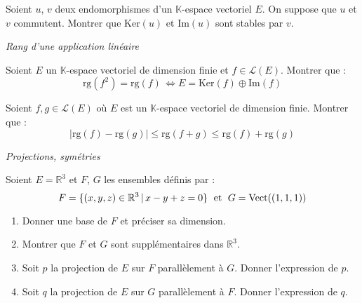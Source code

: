 \documentclass[a4paper,10pt]{report}
\begin{document}
\begin{Exercice}{} Soient $u$, $v$ deux endomorphismes d'un $\mathbb{K}$-espace vectoriel $E$. On suppose que $u$ et $v$ commutent. Montrer que $\textrm{Ker}(u)$ et $\textrm{Im}(u)$ sont stables par $v$.
\end{Exercice} 

\medskip

\begin{center}
\textit{{ {\large Rang d'une application linéaire}}}
\end{center}

\medskip


\begin{Exercice}{} Soient $E$ un $\mathbb{K}$-espace vectoriel de dimension finie et $f \in \mathcal{L}(E)$. Montrer que :
$$ \textrm{rg}(f^2 ) =  \textrm{rg}( f ) \, \Longleftrightarrow E = \textrm{Ker}(f) \oplus \textrm{Im}(f) $$
\end{Exercice}


\begin{Exercice}{} Soient $f,g \in \mathcal{L}(E)$ où $E$ est un $\mathbb{K}$-espace vectoriel de dimension finie. Montrer que :
    \[
    \vert \textrm{rg}(f) - \textrm{rg}(g) \vert \leq \textrm{rg}(f + g) \leq \textrm{rg}(f) + \textrm{rg}(g)
    \]
\end{Exercice}

\medskip

\begin{center}
\textit{{ {\large Projections, symétries}}}
\end{center}

\medskip


\begin{Exercice}{} Soient $E= \mathbb{R}^3$ et $F$, $G$ les ensembles définis par :
$$ F = \lbrace (x,y,z) \in \mathbb{R}^3 \, \vert \, x-y+z=0 \rbrace \; \hbox{ et }  \; G = \textrm{Vect}((1,1,1)) $$

\begin{enumerate}
\item Donner une base de $F$ et préciser sa dimension.
\item Montrer que $F$ et $G$ sont supplémentaires dans $\mathbb{R}^3$.
\item Soit $p$ la projection de $E$ sur $F$ parallèlement à $G$. Donner l'expression de $p$.
\item Soit $q$ la projection de $E$ sur $G$ parallèlement à $F$. Donner l'expression de $q$.
\end{enumerate}
\end{Exercice}
\end{document}
